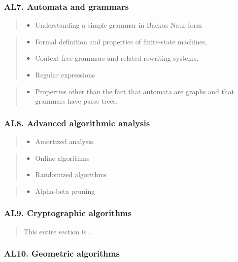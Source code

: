 \documentclass[a4paper,11pt,oneside]{article}
\newcommand{\cmark}{\ding{51}}%
\newcommand{\xmark}{\ding{55}}%
\newcommand{\cdef}{{\small\cmark\faFileTextO}}
\newcommand{\ccode}{{\small\cmark\faFileText}}
\newcommand{\cnfoc}{{\small\faQuestion}}
\newcommand{\cexcl}{{\small\xmark}}
\newcommand{\Idefine}{\item[\hbox to 1.8em{\cdef\hfill}]}
\newcommand{\Icodeonly}{\item[\hbox to 1.8em{\ccode\hfill}]}
\newcommand{\Inofocus}{\item[\hbox to 1.8em{\cnfoc\hfill}]}
\newcommand{\Iexcluded}{\item[\hbox to 1.8em{\cexcl\hfill}]}
\newenvironment{myitemize}{\begin{quote}\begin{itemize}\itemsep 0pt}{\end{itemize}\end{quote}}
\begin{document}
    \subsubsection*{AL7. Automata and grammars}%

    \begin{myitemize}
    \Idefine Understanding a simple grammar in Backus-Naur form
    \end{myitemize}

    \begin{myitemize}
    \Inofocus Formal definition and properties of finite-state machines,
    \Inofocus Context-free grammars and related rewriting systems,
    \Inofocus Regular expressions
    \end{myitemize}
  
    \begin{myitemize}
    \Iexcluded Properties other than the fact that automata are graphs and that grammars have parse trees.
    \end{myitemize}
  
    \subsubsection*{AL8. Advanced algorithmic analysis}%

    \begin{myitemize}
    \Icodeonly Amortized analysis.
    \end{myitemize}

    \begin{myitemize}
    \Inofocus Online algorithms
    \Inofocus Randomized algorithms
    \end{myitemize}

    \begin{myitemize}
    \Iexcluded Alpha-beta pruning
    \end{myitemize}
    
    \subsubsection*{AL9. Cryptographic algorithms}%

    \begin{quote}
    This entire section is \cnfoc.
    \end{quote}

    \subsubsection*{AL10. Geometric algorithms}%
\end{document}
